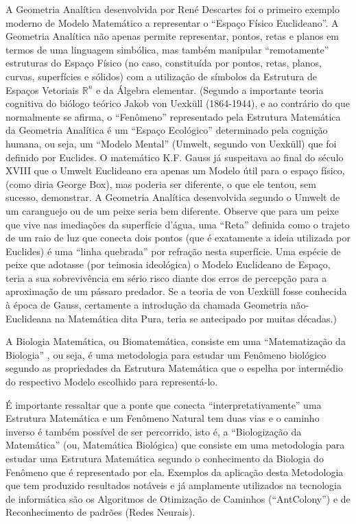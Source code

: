     A Geometria Analítica desenvolvida por René Descartes foi o primeiro exemplo moderno de Modelo Matemático a representar o ``Espaço Físico Euclideano''. A Geometria Analítica não apenas permite representar, pontos, retas e planos em termos de uma linguagem simbólica, mas também manipular ``remotamente'' estruturas do Espaço Físico (no caso, constituída por pontos, retas, planos, curvas, superfícies e sólidos) com a utilização de símbolos da Estrutura de Espaços Vetoriais \(\mathbb{R}^n\) e da Álgebra elementar. (Segundo a importante teoria cognitiva do biólogo teórico Jakob von Uexküll (1864-1944), e ao contrário do que normalmente se afirma, o ``Fenômeno'' representado pela Estrutura Matemática da Geometria Analítica é um ``Espaço Ecológico'' determinado pela cognição humana, ou seja, um ``Modelo Mental'' (Umwelt, segundo von Uexküll) que foi definido por Euclides. O matemático K.F. Gauss já suspeitava ao final do século XVIII que o Umwelt Euclideano era apenas um Modelo útil para o espaço físico, (como diria George Box), mas poderia ser diferente, o que ele tentou, sem sucesso, demonstrar. A Geometria Analítica desenvolvida segundo o Umwelt de um caranguejo ou de um peixe seria bem diferente. Observe que para um peixe que vive nas imediações da superfície d’água, uma ``Reta'' definida como o trajeto de um raio de luz que conecta dois pontos (que é exatamente a ideia utilizada por Euclides) é uma ``linha quebrada'' por refração nesta superfície. Uma espécie de peixe que adotasse (por teimosia ideológica) o Modelo Euclideano de Espaço, teria a sua sobrevivência em sério risco diante dos erros de percepção para a aproximação de um pássaro predador. Se a teoria de von Uexküll fosse conhecida à época de Gauss, certamente a introdução da chamada Geometria não-Euclideana na Matemática dita Pura, teria se antecipado por muitas décadas.)

    A Biologia Matemática, ou Biomatemática, consiste em uma ``Matematização da Biologia'' , ou seja, é uma metodologia para estudar um Fenômeno biológico segundo as propriedades da Estrutura Matemática que o espelha por intermédio do respectivo Modelo escolhido para representá-lo.

    É importante ressaltar que a ponte que conecta ``interpretativamente'' uma Estrutura Matemática e um Fenômeno Natural tem duas vias e o caminho inverso é também possível de ser percorrido, isto é, a ``Biologização da Matemática'' (ou, Matemática Biológica) que consiste em uma metodologia para estudar uma Estrutura Matemática segundo o conhecimento da Biologia do Fenômeno que é representado por ela. Exemplos da aplicação desta Metodologia que tem produzido resultados notáveis e já amplamente utilizados na tecnologia de informática são os Algoritmos de Otimização de Caminhos (``AntColony'') e de Reconhecimento de padrões (Redes Neurais).


